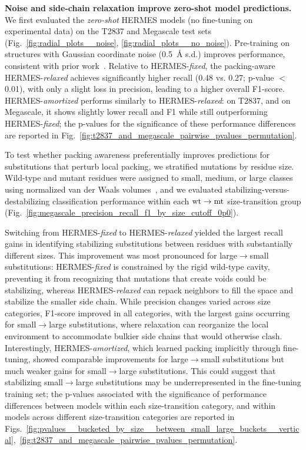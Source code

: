 \noindent\textbf{Noise and side-chain relaxation improve zero-shot model predictions.} We first
evaluated the \emph{zero-shot} HERMES models (no fine-tuning on experimental data) on the T2837 and
Megascale test sets (Fig.~\ref{fig:radial_plots__noise}, \ref{fig:radial_plots__no_noise}).
Pre-training on structures with Gaussian coordinate noise (0.5~\AA{} s.d.) improves performance,
consistent with prior work~\citep{dauparas_robust_2022, pun_learning_2024}. Relative to
HERMES-\emph{fixed}, the packing-aware HERMES-\emph{relaxed} achieves significantly higher recall
(0.48 vs. 0.27; p-value $<$ 0.01), with only a slight loss in precision, leading to a higher overall
F1-score. HERMES-\emph{amortized} performs similarly to HERMES-\emph{relaxed}: on T2837, and on
Megascale, it shows slightly lower recall and F1 while still outperforming HERMES-\emph{fixed}; the
p-values for the significance of these performance differences are reported in
Fig.~\ref{fig:t2837_and_megascale_pairwise_pvalues_permutation}.

To test whether packing awareness preferentially improves predictions for substitutions that perturb
local packing, we stratified mutations by residue size. Wild-type and mutant residues were assigned
to small, medium, or large classes using normalized van der Waals volumes~\citep{mei_new_2005}, and
we evaluated stabilizing-versus-destabilizing classification performance within each ${\text{wt}} \to {\text{mt}}$
size-transition group (Fig.~\ref{fig:megascale_precision_recall_f1_by_size_cutoff_0p0}).


Switching from HERMES-{\em fixed} to HERMES-{\em relaxed} yielded the largest recall gains in
identifying stabilizing substitutions between residues with substantially different sizes. This
improvement was most pronounced for large$\to$small substitutions: HERMES-{\em fixed} is constrained
by the rigid wild-type cavity, preventing it from recognizing that mutations that create voids could
be stabilizing, whereas HERMES-{\em relaxed} can repack neighbors to fill the space and stabilize
the smaller side chain. While precision changes varied across size categories, F1-score improved in
all categories, with the largest gains occurring for small$\to$large substitutions, where relaxation
can reorganize the local environment to accommodate bulkier side chains that would otherwise clash.
Interestingly, HERMES-\emph{amortized}, which learned packing implicitly through fine-tuning, showed
comparable improvements for large$\to$small substitutions but much weaker gains for small$\to$large
substitutions. This could suggest that stabilizing small$\to$large substitutions may be
underrepresented in the fine-tuning training set; the p-values associated with the significance of
performance differences between models within each size-transition category, and within models
across different size-transition categories are reported in
Figs.~\ref{fig:pvalues__bucketed_by_size__between_small_large_buckets__vertical},~\ref{fig:t2837_and_megascale_pairwise_pvalues_permutation}.

